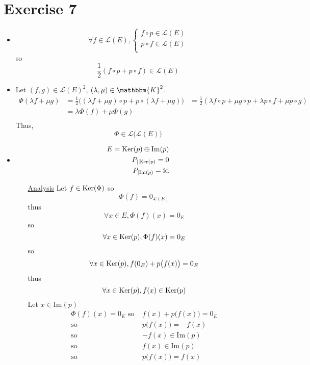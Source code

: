 \part{Exercise 7}

\begin{itemize}
	\item 
		\[
			\forall f \in \mathcal{L}(E), \begin{cases}
				f \circ p \in \mathcal{L}(E)\\
				p \circ f \in \mathcal{L}(E)\\
			\end{cases}
		\] so \[
			\frac{1}{2}(f \circ p + p \circ f) \in \mathcal{L}(E)
		\]
	\item Let $(f,g) \in \mathcal{L}(E)^2$, $(\lambda, \mu) \in \mathbbm{K}^2$.
		\begin{align*}
			\Phi(\lambda f + \mu g) &= \frac{1}{2}\big((\lambda f + \mu g) \circ p + p  \circ (\lambda f + \mu g)\big) 
			&= \frac{1}{2} (\lambda f \circ p + \mu g \circ p + \lambda p  \circ f + \mu p \circ g)\\
			&= \lambda \Phi(f) + \mu \Phi(g) \\
		\end{align*}
		Thus, \[
			\Phi \in \mathcal{L}\big(\mathcal{L}(E)\big)
		\]
	\item
		\begin{align*}
			E = \operatorname{Ker}(p) \oplus \mathrm{Im}(p)\\
			P_{|\operatorname{Ker}(p)} = 0\\
			P_{|\mathrm{Im}(p)} = \operatorname{id}
		\end{align*}
		\begin{itemize}
			\item[\underline{\sc Analysis}] Let $f \in \operatorname{Ker}(\Phi)$ so \[
					\Phi(f) = 0_{\mathcal{L}(E)}
				\] thus \[
					\forall x \in E, \Phi(f)(x) = 0_E
				\] so \[
					\forall x \in \operatorname{Ker}(p), \Phi(f)(x) = 0_E
				\] so \[
					\forall x \in \operatorname{Ker}(p), f(0_E) + p\big(f(x)\big) = 0_E
				\] thus \[
					\forall x \in \operatorname{Ker}(p), f(x) \in \operatorname{Ker}(p)
				\]
				Let $x \in \mathrm{Im}(p)$ 
				\begin{align*}
					\Phi(f)(x) = 0_E \text{ so }& f(x) + p\big(f(x)\big) = 0_E\\
					\text{so }& p\big(f(x)\big) = -f(x)\\
					\text{so }& -f(x) \in \mathrm{Im}(p)\\
					\text{so }& f(x) \in \mathrm{Im}(p)\\
					\text{so }& p\big(f(x)\big) = f(x)\\

\end{align*}
\end{itemize}
\end{itemize}
